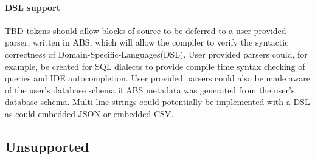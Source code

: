 \documentclass[hidelinks]{article}
\begin{document}
\paragraph{DSL support}
TBD tokens should allow blocks of source to be deferred to a user provided parser, written in ABS, which will allow the compiler to verify the syntactic correctness of Domain-Specific-Languages(DSL). User provided parsers could, for example, be created for SQL dialects to provide compile time syntax checking of queries and IDE autocompletion. User provided parsers could also be made aware of the user's database schema if ABS metadata was generated from the user's database schema. Multi-line strings could potentially be implemented with a DSL as could embedded JSON or embedded CSV.
\subsection{Unsupported}
\end{document}

